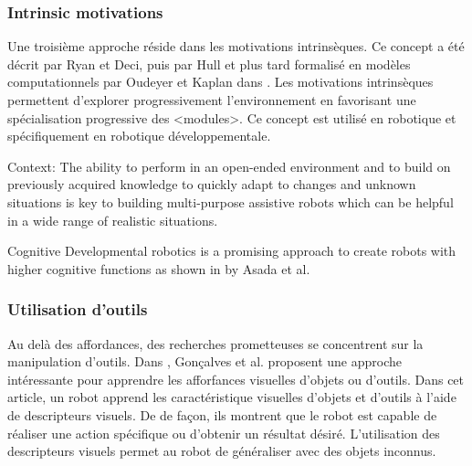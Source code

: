 \documentclass{llncs}
\begin{document}
\subsubsection{Intrinsic motivations}
Une troisième approche réside dans les motivations intrinsèques. Ce concept a été décrit par Ryan et Deci, puis par Hull et plus tard formalisé en modèles computationnels par Oudeyer et Kaplan dans \cite{10.3389/neuro.12.006.2007}. Les motivations intrinsèques permettent d'explorer progressivement l'environnement en favorisant une spécialisation progressive des <modules>. Ce concept est utilisé en robotique et spécifiquement en robotique développementale.


Context: The ability to perform in an open-ended environment and to build on previously acquired knowledge to quickly adapt to changes and unknown situations is key to building
multi-purpose assistive robots which can be helpful in a wide range of realistic situations.

Cognitive Developmental robotics is a promising approach to create robots with higher cognitive functions as shown in \cite{Asada2009} by Asada et al.

\subsubsection{Utilisation d'outils}
Au delà des affordances, des recherches prometteuses se concentrent sur la manipulation d'outils. Dans \cite{Goncalves2014}, Gonçalves et al. proposent une approche intéressante pour apprendre les afforfances visuelles d'objets ou d'outils. Dans cet article, un robot apprend les caractéristique visuelles d'objets et d'outils à l'aide de descripteurs visuels. De de façon, ils montrent que le robot est capable de réaliser une action spécifique ou d'obtenir un résultat désiré. L'utilisation des descripteurs visuels permet au robot de généraliser avec des objets inconnus.

\end{document}

